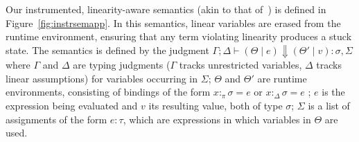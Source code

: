\documentclass[acmsmall,review,screen]{acmart}
\begin{document}
Our instrumented, linearity-aware semantics (akin to that
of~\cite{cite:linearhaskell})
is defined in Figure~\ref{fig:instrsemapp}.
In this semantics, linear variables are erased from
the runtime environment, ensuring that any term violating linearity
produces a stuck state. The semantics is defined by
the judgment $\Gamma ; \Delta \vdash (\Theta \mid e) \Downarrow (\Theta'
\mid v) : \sigma , \Sigma$ where $\Gamma$ and $\Delta$ are typing judgments
($\Gamma$ tracks unrestricted variables, $\Delta$ tracks linear
assumptions) for variables occurring in $\Sigma$;
$\Theta$ and $\Theta'$ are runtime environments, consisting of bindings of the form
$x :_\pi \sigma = e$ or $x :_\Delta \sigma = e$ ; $e$ is the expression being evaluated and $v$
its resulting value, both of type $\sigma$; $\Sigma$ is a list of assignments of the form
$e : \tau$, which are expressions in which variables in $\Theta$ are
used.
\end{document}
